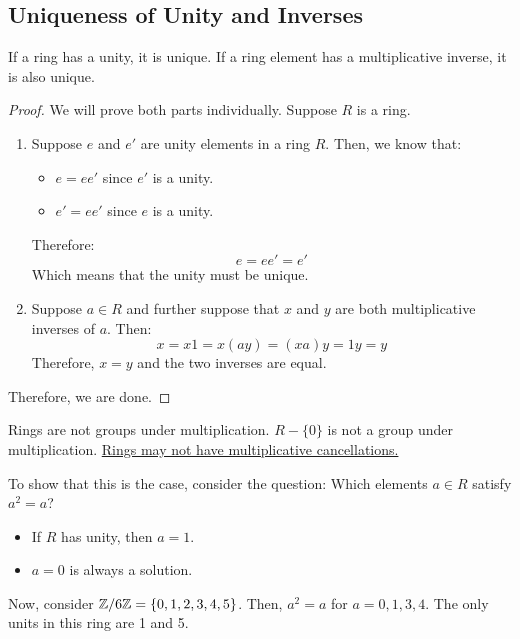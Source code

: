 \documentclass[letterpaper]{article}
\begin{document}
\subsection{Uniqueness of Unity and Inverses}
\begin{theorem}{}{}
    If a ring has a unity, it is unique. If a ring element has a multiplicative inverse, it is also unique. 
\end{theorem}

\begin{mdframed}[]
    \begin{proof}
        We will prove both parts individually. Suppose $R$ is a ring.  
        \begin{enumerate}
            \item Suppose $e$ and $e'$ are unity elements in a ring $R$. Then, we know that: 
            \begin{itemize}
                \item $e = ee'$ since $e'$ is a unity. 
                \item $e' = ee'$ since $e$ is a unity. 
            \end{itemize}
            Therefore: 
            \[e = ee' = e'\]
            Which means that the unity must be unique. 

            \item Suppose $a \in R$ and further suppose that $x$ and $y$ are both multiplicative inverses of $a$. Then: 
            \[x = x1 = x(ay) = (xa)y = 1y = y\]
            Therefore, $x = y$ and the two inverses are equal. 
        \end{enumerate}
        Therefore, we are done. 
    \end{proof}
\end{mdframed}

\begin{note}{}{}
    Rings are not groups under multiplication. $R - \{0\}$ is not a group under multiplication. \underline{Rings may not have multiplicative cancellations.}
\end{note}
To show that this is the case, consider the question: Which elements $a \in R$ satisfy $a^2 = a$?
\begin{itemize}
    \item If $R$ has unity, then $a = 1$.
    \item $a = 0$ is always a solution.
\end{itemize}
Now, consider $\mathbb{Z} / 6 \mathbb{Z} = \{0, 1, 2, 3, 4, 5\}$. Then, $a^2 = a$ for $a = 0, 1, 3, 4$. The only units in this ring are 1 and 5. 
\end{document}
